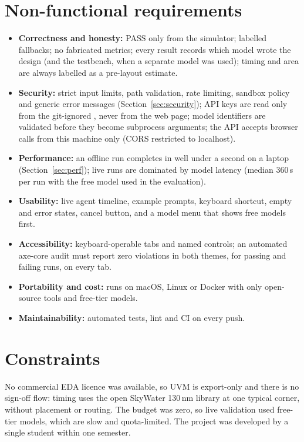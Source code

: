 \section{Non-functional requirements}
\begin{itemize}
\item \textbf{Correctness and honesty:} PASS only from the simulator; labelled fallbacks; no fabricated metrics; every result records which model wrote the design (and the testbench, when a separate model was used); timing and area are always labelled as a pre-layout estimate.
\item \textbf{Security:} strict input limits, path validation, rate limiting, sandbox policy and generic error messages (Section~\ref{sec:security}); API keys are read only from the git-ignored , never from the web page; model identifiers are validated before they become subprocess arguments; the API accepts browser calls from this machine only (CORS restricted to localhost).
\item \textbf{Performance:} an offline run completes in well under a second on a laptop (Section~\ref{sec:perf}); live runs are dominated by model latency (median 360\,s per run with the free model used in the evaluation).
\item \textbf{Usability:} live agent timeline, example prompts, keyboard shortcut, empty and error states, cancel button, and a model menu that shows free models first.
\item \textbf{Accessibility:} keyboard-operable tabs and named controls; an automated axe-core audit must report zero violations in both themes, for passing and failing runs, on every tab.
\item \textbf{Portability and cost:} runs on macOS, Linux or Docker with only open-source tools and free-tier models.
\item \textbf{Maintainability:} automated tests, lint and CI on every push.
\end{itemize}

\section{Constraints}
No commercial EDA licence was available, so UVM is export-only and there is no sign-off flow: timing uses the open SkyWater 130\,nm library at one typical corner, without placement or routing. The budget was zero, so live validation used free-tier models, which are slow and quota-limited. The project was developed by a single student within one semester.

